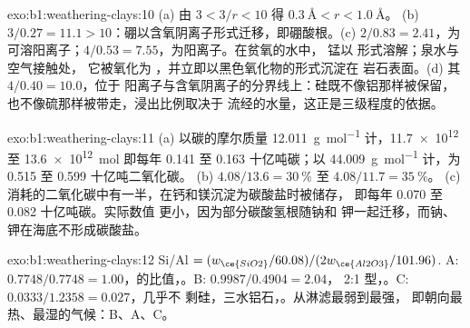 \begin{solution}{exo:b1:weathering-clays:10}
(a) 由 $3 < 3/r < 10$ 得 $\qty{0.3}{\angstrom} < r < \qty{1.0}{\angstrom}$。
(b) $3/0.27 = 11.1 > 10$：硼以含氧阴离子形式迁移，即硼酸根。(c) $2/0.83 =
2.41$，为可溶阳离子；$4/0.53 = 7.55$，为阳离子。在贫氧的水中，
锰以  形式溶解；泉水与空气接触处，
它被氧化为 ，并立即以黑色氧化物的形式沉淀在
岩石表面。(d) 其 $4/0.40 = 10.0$，位于
阳离子与含氧阴离子的分界线上：硅既不像铝那样被保留，
也不像硫那样被带走，浸出比例取决于
流经的水量，这正是三级程度的依据。
\end{solution}

\begin{solution}{exo:b1:weathering-clays:11}
(a) 以碳的摩尔质量 \qty{12.011}{g.mol^{-1}} 计，\num{11.7e12} 至
\qty{13.6e12}{mol} 即每年 0.141 至 0.163 十亿吨碳；以
\qty{44.009}{g.mol^{-1}} 计，为 0.515 至 0.599 十亿吨二氧化碳。
(b) $4.08/13.6 = \qty{30}{\percent}$ 至 $4.08/11.7 = \qty{35}{\percent}$。
(c) 消耗的二氧化碳中有一半，在钙和镁沉淀为碳酸盐时被储存，
即每年 0.070 至 0.082 十亿吨碳。实际数值
更小，因为部分碳酸氢根随钠和
钾一起迁移，而钠、钾在海底不形成碳酸盐。
\end{solution}

\begin{solution}{exo:b1:weathering-clays:12}
Si/Al $= (w_{\ce{SiO2}}/60.08)/(2w_{\ce{Al2O3}}/101.96)$. A: $0.7748/0.7748 =
1.00$，的比值，。B: $0.9987/0.4904 = 2.04$，
2:1 型，。C: $0.0333/1.2358 = 0.027$，几乎不
剩硅，三水铝石，。从淋滤最弱到最强，
即朝向最热、最湿的气候：B、A、C。
\end{solution}

